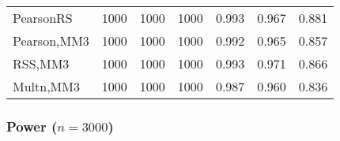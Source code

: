 \documentclass[
]{article}
\begin{document}
\begin{table}[H]
{\begin{tabular}[t]{lrrrrrr}
\hspace{1em}PearsonRS & 1000 & 1000 & 1000 & 0.993 & 0.967 & 0.881\\
\hspace{1em}Pearson,MM3 & 1000 & 1000 & 1000 & 0.992 & 0.965 & 0.857\\
\hspace{1em}RSS,MM3 & 1000 & 1000 & 1000 & 0.993 & 0.971 & 0.866\\
\hspace{1em}Multn,MM3 & 1000 & 1000 & 1000 & 0.987 & 0.960 & 0.836\\
\bottomrule
\end{tabular}}
\end{table}

\hypertarget{power-n3000-3}{%
\subsubsection{\texorpdfstring{Power
(\(n=3000\))}{Power (n=3000)}}\label{power-n3000-3}}
\end{document}
